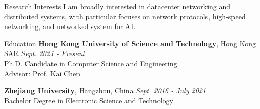 \documentclass{resume} %
\begin{document}

\begin{rSection}{Research Interests}
I am broadly interested in datacenter networking and distributed systems, with particular focuses on network protocols, high-speed networking, and networked system for AI.

	
\end{rSection}

\begin{rSection}{Education}
{\bf Hong Kong University of Science and Technology}{, Hong Kong SAR} \hfill {\em Sept. 2021 - Present}
\\ Ph.D. Candidate in Computer Science and Engineering %
\\ Advisor: Prof. Kai Chen

{\bf Zhejiang University}{, Hangzhou, China} \hfill {\em Sept. 2016 - July 2021} 
\\ Bachelor Degree in Electronic Science and Technology %



\end{rSection}
\end{document}

